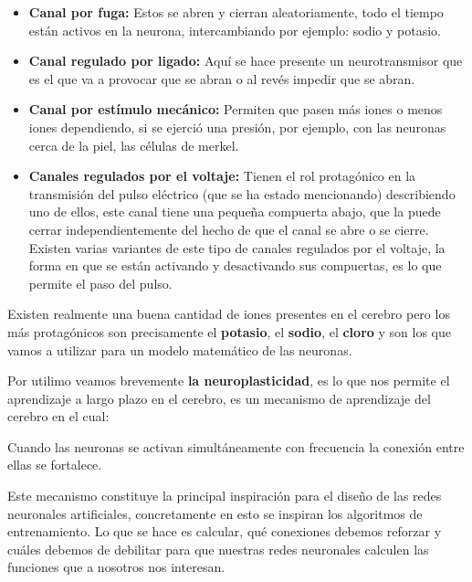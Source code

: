 \begin{itemize}
\item \textbf{Canal por fuga:} Estos se abren y cierran aleatoriamente, todo el tiempo están activos en la neurona, intercambiando por ejemplo: sodio y potasio.
\item \textbf{Canal regulado por ligado:} Aquí se hace presente un neurotransmisor que es el que va a provocar que se abran o al revés impedir que se abran.
\item  \textbf{Canal por estímulo mecánico:} Permiten que pasen más iones o menos iones dependiendo, si se ejerció una presión, por ejemplo, con las neuronas cerca
de la piel, las células de merkel.
\item \textbf{Canales regulados por el voltaje:} Tienen el rol protagónico en la transmisión del pulso eléctrico (que se ha estado mencionando) describiendo uno de ellos, este canal tiene una pequeña compuerta abajo, que la puede cerrar independientemente del hecho de que el canal se abre o se cierre. Existen varias variantes de este tipo de canales regulados por el voltaje, la forma en que se están activando y desactivando sus compuertas, es lo que permite el paso del pulso.
\end{itemize}

Existen realmente una buena cantidad de iones presentes en el cerebro pero los más protagónicos son precisamente el \textbf{potasio}, el \textbf{sodio}, el \textbf{cloro} y son los que vamos a utilizar para un modelo matemático de las neuronas. 

Por utilimo veamos brevemente \textbf{la neuroplasticidad}, es lo que nos permite el aprendizaje a largo plazo en el cerebro, es un mecanismo de aprendizaje del cerebro en el cual:

Cuando las neuronas se activan simultáneamente con frecuencia la conexión entre ellas se fortalece.

Este mecanismo constituye la principal inspiración para el diseño de las redes neuronales artificiales, concretamente en esto se inspiran los algoritmos de entrenamiento. Lo que se hace es calcular, qué conexiones debemos reforzar y cuáles debemos de debilitar para que nuestras redes neuronales calculen las funciones que a nosotros nos interesan.

